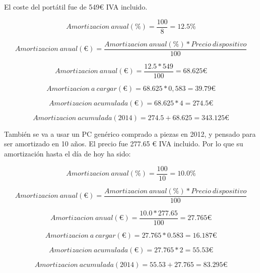 El coste del port\'atil fue de 549€ IVA incluido.
\begin{center}
\begin{equation}
Amortizacion \ anual (\%) = \frac{100}{8} = 12.5 \%
\end{equation}

\begin{equation}
Amortizacion \ anual (€) = \frac{Amortizacion \ anual(\%) * Precio \ dispositivo}{100}
\end{equation}

\begin{equation}
Amortizacion \ anual (€) = \frac{12.5 * 549}{100} = 68.625 €
\end{equation}

\begin{equation}
Amortizacion \ a \ cargar (€) = 68.625 * 0,583 = 39.79 €
\end{equation}


\begin{equation}
Amortizacion \ acumulada (€) = 68.625 * 4 = 274.5 €
\end{equation}

\begin{equation}
Amortizacion \ acumulada (2014) = 274.5 + 68.625 = 343.125 €
\end{equation}

\end{center}

Tambi\'{e}n se va a usar un PC gen\'{e}rico comprado a piezas en 2012, y pensado para
ser amortizado en 10 a\~nos. El precio fue 277.65 € IVA incluido.
Por lo que su amortizaci\'on hasta el d\'ia de hoy ha sido:

\begin{center}
\begin{equation}
Amortizacion \ anual (\%) = \frac{100}{10} = 10.0 \%
\end{equation}

\begin{equation}
Amortizacion \ anual (€) = \frac{Amortizacion \ anual(\%) * Precio \ dispositivo}{100}
\end{equation}

\begin{equation}
Amortizacion \ anual (€) = \frac{10.0 * 277.65}{100} = 27.765 €
\end{equation}

\begin{equation}
Amortizacion \ a \ cargar (€) = 27.765 * 0.583 = 16.187 €
\end{equation}

\begin{equation}
Amortizacion \ acumulada (€) = 27.765 * 2 = 55.53 €
\end{equation}

\begin{equation}
Amortizacion \ acumulada (2014) = 55.53 + 27.765 = 83.295 €
\end{equation}

\end{center}

